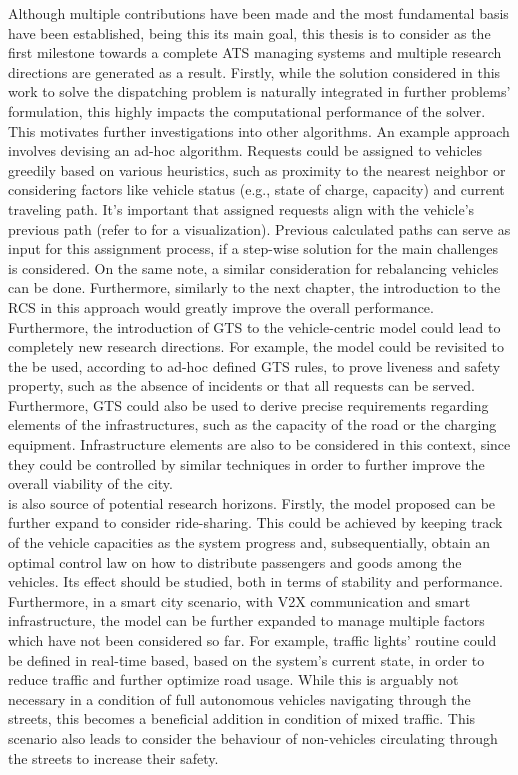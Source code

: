 Although multiple contributions have been made and the most fundamental basis have been established, being this its main goal, this thesis is to consider as the first milestone towards a complete ATS managing systems and multiple research directions are generated as a result. Firstly, while the solution considered in this work to solve the dispatching problem is naturally integrated in further problems' formulation, this highly impacts the computational performance of the solver. This motivates further investigations into other algorithms. An example approach involves devising an ad-hoc algorithm. Requests could be assigned to vehicles greedily based on various heuristics, such as proximity to the nearest neighbor or considering factors like vehicle status (e.g., state of charge, capacity) and current traveling path. It's important that assigned requests align with the vehicle's previous path (refer to   for a visualization). Previous calculated paths can serve as input for this assignment process, if a step-wise solution for the main challenges is considered. On the same note, a similar consideration for rebalancing vehicles can be done. Furthermore, similarly to the next chapter, the introduction to the RCS in this approach would greatly improve the overall performance. Furthermore, the introduction of GTS to the vehicle-centric model could lead to completely new research directions. For example, the model could be revisited to the be used, according to ad-hoc defined GTS rules, to prove liveness and safety property, such as the absence of incidents or that all requests can be served. Furthermore, GTS could also be used to derive precise requirements regarding elements of the infrastructures, such as the capacity of the road or the charging equipment. Infrastructure elements are also to be considered in this context, since they could be controlled by similar techniques in order to further improve the overall viability of the city.\\
 is also source of potential research horizons. Firstly, the model proposed can be further expand to consider ride-sharing. This could be achieved by keeping track of the vehicle capacities as the system progress and, subsequentially, obtain an optimal control law on how to distribute passengers and goods among the vehicles. Its effect should be studied, both in terms of stability and performance. Furthermore, in a smart city scenario, with V2X communication and smart infrastructure, the model can be further expanded to manage multiple factors which have not been considered so far. For example, traffic lights' routine could be defined in real-time based, based on the system's current state, in order to reduce traffic and further optimize road usage. While this is arguably not necessary in a condition of full autonomous vehicles navigating through the streets, this becomes a beneficial addition in condition of mixed traffic. This scenario also leads to consider the behaviour of non-vehicles circulating through the streets to increase their safety. \\
